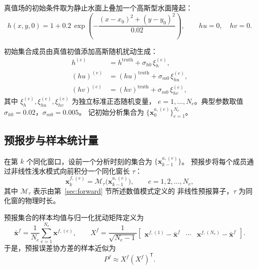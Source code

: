 \documentclass[12pt,a4paper]{article}
\newcommand{\x}{\bm{x}}
\newcommand{\T}{^{\mathsf T}}
\newcommand{\calM}{\mathcal{M}}
\begin{document}
真值场的初始条件取为静止水面上叠加一个高斯型水面隆起：
\begin{equation}
  h(x, y, 0) = 1 + 0.2\,
  \exp\!\left(-\frac{(x - x_0)^2 + (y - y_0)^2}{0.02}\right),
  \qquad hu = 0,\quad hv = 0.
  \label{eq:truth-init}
\end{equation}

初始集合成员由真值初值添加高斯随机扰动生成：
\begin{align}
  h^{(e)} &= h^{\mathrm{truth}} + \sigma_{h0}\,\xi_h^{(e)}, \label{eq:init-h} \\
  (hu)^{(e)} &= (hu)^{\mathrm{truth}} + \sigma_{m0}\,\xi_{hu}^{(e)}, \label{eq:init-hu} \\
  (hv)^{(e)} &= (hv)^{\mathrm{truth}} + \sigma_{m0}\,\xi_{hv}^{(e)}, \label{eq:init-hv}
\end{align}
其中 $\xi_h^{(e)}, \xi_{hu}^{(e)}, \xi_{hv}^{(e)}$ 为独立标准正态随机变量，
$e = 1, \dots, N_e$。典型参数取值 $\sigma_{h0} = 0.02$，$\sigma_{m0} = 0.005$。
记初始分析集合为 $\{\x_0^{a,(e)}\}_{e=1}^{N_e}$。

\subsection{预报步与样本统计量}

在第 $k$ 个同化窗口，设前一个分析时刻的集合为 $\{\x_{k-1}^{a,(e)}\}$。
预报步将每个成员通过非线性浅水模式向前积分一个同化窗长 $\tau$：
\begin{equation}
  \x_k^{f,(e)} = \calM_\tau\bigl(\x_{k-1}^{a,(e)}\bigr),
  \qquad e = 1, 2, \dots, N_e,
  \label{eq:forecast}
\end{equation}
其中 $\calM_\tau$ 表示由第~\ref{sec:forward} 节所述数值模式定义的
非线性预报算子，$\tau$ 为同化窗的物理时长。

预报集合的样本均值与归一化扰动矩阵定义为
\begin{equation}
  \bar{\x}^f = \frac{1}{N_e}\sum_{e=1}^{N_e} \x^{f,(e)},
  \qquad
  X^f = \frac{1}{\sqrt{N_e - 1}}
  \begin{bmatrix}
    \x^{f,(1)} - \bar{\x}^f & \cdots & \x^{f,(N_e)} - \bar{\x}^f
  \end{bmatrix}.
  \label{eq:ensemble-stat}
\end{equation}
于是，预报误差协方差的样本近似为
\begin{equation}
  P^f \approx X^f (X^f)\T.
  \label{eq:Pf-approx}
\end{equation}
\end{document}
